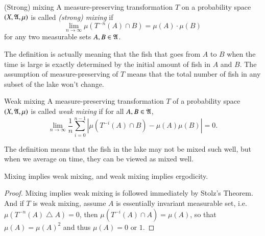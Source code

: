 \documentclass[12pt,a4paper]{article}
\begin{document}
	
	\begin{definition}{(Strong) mixing}{}
		A measure-preserving transformation $T$ on a probability space $(X,\mathfrak{A},\mu)$ is called \emph{(strong) mixing} if 
		$$
		\lim_{n\to \infty} \mu(T^{-n}(A)\cap B)=\mu(A)\cdot \mu (B)
		$$
		for any two measurable sets $A,B\in\mathfrak{A}$.
	\end{definition}
	The definition is actually meaning that the fish that goes from $A$ to $B$ when the time is large is exactly determined by the initial amount of fish in $A$ and $B$. The assumption of measure-preserving of $T$ means that the total number of fish in any subset of the lake won't change.
	
	\begin{definition}{Weak mixing}{}
		A measure-preserving transformation $T$ of a probability space $(X,\mathfrak{A},\mu)$ is called \emph{weak mixing} if for all $A,B\in \mathfrak{A}$,
		$$
		\lim_{n\to \infty}\frac{1}{n}\sum_{i=0}^{n-1} |\mu(T^{-i}(A)\cap B)-\mu(A)\mu(B)|=0.
		$$
	\end{definition}
	The definition means that the fish in the lake may not be mixed such well, but when we average on time, they can be viewed as mixed well.
	
	\begin{proposition}{}{}
		Mixing implies weak mixing, and weak mixing implies ergodicity.
	\end{proposition}
	\begin{proof}
		Mixing implies weak mixing is followed immediately by Stolz's Theorem. And if $T$ is weak mixing, assume $A$ is essentially invariant measurable set, i.e. $\mu(T^{-n}(A)\bigtriangleup A)=0$, then $\mu(T^{-i}(A)\cap A)=\mu(A)$, so that
		$\mu(A)=\mu(A)^2$ and thus $ \mu(A)=0\text{ or }1.$
	\end{proof}
	
\end{document}
